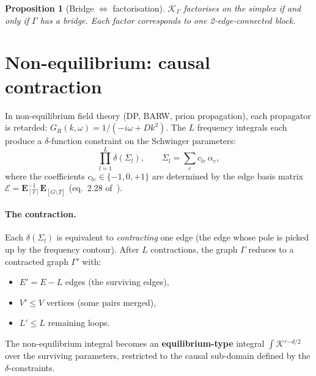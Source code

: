 \documentclass[11pt,a4paper]{article}
\newtheorem{proposition}[theorem]{Proposition}
\theoremstyle{definition}
\newcommand{\K}{\mathcal{K}}
\begin{document}
\begin{proposition}[Bridge $\Leftrightarrow$ factorisation]
\label{prop:bridge}
$\K_\Gamma$ factorises on the simplex if and only if $\Gamma$ has
a bridge. Each factor corresponds to one 2-edge-connected block.
\end{proposition}


\section{Non-equilibrium: causal contraction}
\label{sec:causal}

In non-equilibrium field theory (DP, BARW, prion propagation),
each propagator is retarded: $G_R(k,\omega) = 1/(-i\omega + Dk^2)$.
The $L$ frequency integrals each produce a $\delta$-function
constraint on the Schwinger parameters:
\begin{equation}
\prod_{l=1}^L \delta(\Sigma_l), \qquad
\Sigma_l = \sum_e c_{le}\,\alpha_e,
\end{equation}
where the coefficients $c_{le} \in \{-1, 0, +1\}$ are determined
by the edge basis matrix $\mathcal{E} = \mathbf{E}_{[T]}^{-1}
\mathbf{E}_{[G \setminus T]}$ (eq.~2.28 of~\cite{amarteifio2019}).

\paragraph{The contraction.}
Each $\delta(\Sigma_l)$ is equivalent to \emph{contracting} one
edge (the edge whose pole is picked up by the frequency contour).
After $L$ contractions, the graph $\Gamma$ reduces to a contracted
graph $\Gamma'$ with:
\begin{itemize}
\item $E' = E - L$ edges (the surviving edges),
\item $V' \leq V$ vertices (some pairs merged),
\item $L' \leq L$ remaining loops.
\end{itemize}

The non-equilibrium integral becomes an \textbf{equilibrium-type}
integral $\int \K'{}^{-d/2}$ over the surviving parameters, restricted
to the causal sub-domain defined by the $\delta$-constraints.
\end{document}
